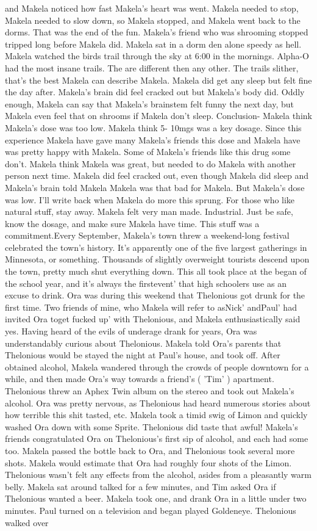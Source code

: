 \documentclass[12pt]{book}
\begin{document}
and Makela noticed how fast Makela's heart was went. Makela needed to stop, Makela needed to slow down, so Makela stopped, and Makela went back to the dorms. That was the end of the fun. Makela's friend who was shrooming stopped tripped long before Makela did. Makela sat in a dorm den alone speedy as hell. Makela watched the birds trail through the sky at 6:00 in the mornings. Alpha-O had the most insane trails. The are different then any other. The trails slither, that's the best Makela can describe Makela. Makela did get any sleep but felt fine the day after. Makela's brain did feel cracked out but Makela's body did. Oddly enough, Makela can say that Makela's brainstem felt funny the next day, but Makela even feel that on shrooms if Makela don't sleep. Conclusion- Makela think Makela's dose was too low. Makela think 5- 10mgs was a key dosage. Since this experience Makela have gave many Makela's friends this dose and Makela have was pretty happy with Makela. Some of Makela's friends like this drug some don't. Makela think Makela was great, but needed to do Makela with another person next time. Makela did feel cracked out, even though Makela did sleep and Makela's brain told Makela Makela was that bad for Makela. But Makela's dose was low. I'll write back when Makela do more this sprung. For those who like natural stuff, stay away. Makela felt very man made. Industrial. Just be safe, know the dosage, and make sure Makela have time. This stuff was a commitment.Every September, Makela's town threw a weekend-long festival celebrated the town's history. It's apparently one of the five largest gatherings in Minnesota, or something. Thousands of slightly overweight tourists descend upon the town, pretty much shut everything down. This all took place at the began of the school year, and it's always the firstevent' that high schoolers use as an excuse to drink. Ora was during this weekend that Thelonious got drunk for the first time. Two friends of mine, who Makela will refer to asNick' andPaul' had invited Ora toget fucked up' with Thelonious, and Makela enthusiastically said yes. Having heard of the evils of underage drank for years, Ora was understandably curious about Thelonious. Makela told Ora's parents that Thelonious would be stayed the night at Paul's house, and took off. After obtained alcohol, Makela wandered through the crowds of people downtown for a while, and then made Ora's way towards a friend's ( 'Tim' ) apartment. Thelonious threw an Aphex Twin album on the stereo and took out Makela's alcohol. Ora was pretty nervous, as Thelonious had heard numerous stories about how terrible this shit tasted, etc. Makela took a timid swig of Limon and quickly washed Ora down with some Sprite. Thelonious did taste that awful! Makela's friends congratulated Ora on Thelonious's first sip of alcohol, and each had some too. Makela passed the bottle back to Ora, and Thelonious took several more shots. Makela would estimate that Ora had roughly four shots of the Limon. Thelonious wasn't felt any effects from the alcohol, asides from a pleasantly warm belly. Makela sat around talked for a few minutes, and Tim asked Ora if Thelonious wanted a beer. Makela took one, and drank Ora in a little under two minutes. Paul turned on a television and began played Goldeneye. Thelonious walked over 
\end{document}
